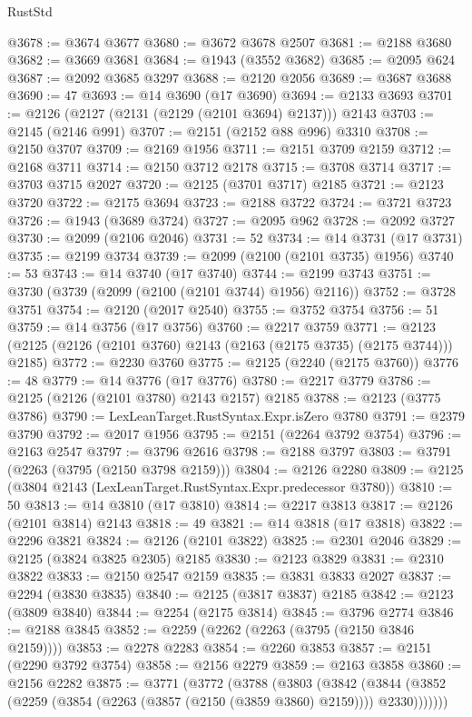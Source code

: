 \begin{lexlean}{RustStd}
\begin{coremodule}
@3678 := @3674 @3677
@3680 := @3672 @3678 @2507
@3681 := @2188 @3680
@3682 := @3669 @3681
@3684 := @1943 (@3552 @3682)
@3685 := @2095 @624
@3687 := @2092 @3685 @3297
@3688 := @2120 @2056
@3689 := @3687 @3688
@3690 := 47
@3693 := @14 @3690 (@17 @3690)
@3694 := @2133 @3693
@3701 := @2126 (@2127 (@2131 (@2129 (@2101 @3694) @2137))) @2143
@3703 := @2145 (@2146 @991)
@3707 := @2151 (@2152 @88 @996) @3310
@3708 := @2150 @3707
@3709 := @2169 @1956
@3711 := @2151 @3709 @2159
@3712 := @2168 @3711
@3714 := @2150 @3712 @2178
@3715 := @3708 @3714
@3717 := @3703 @3715 @2027
@3720 := @2125 (@3701 @3717) @2185
@3721 := @2123 @3720
@3722 := @2175 @3694
@3723 := @2188 @3722
@3724 := @3721 @3723
@3726 := @1943 (@3689 @3724)
@3727 := @2095 @962
@3728 := @2092 @3727
@3730 := @2099 (@2106 @2046)
@3731 := 52
@3734 := @14 @3731 (@17 @3731)
@3735 := @2199 @3734
@3739 := @2099 (@2100 (@2101 @3735) @1956)
@3740 := 53
@3743 := @14 @3740 (@17 @3740)
@3744 := @2199 @3743
@3751 := @3730 (@3739 (@2099 (@2100 (@2101 @3744) @1956) @2116))
@3752 := @3728 @3751
@3754 := @2120 (@2017 @2540)
@3755 := @3752 @3754
@3756 := 51
@3759 := @14 @3756 (@17 @3756)
@3760 := @2217 @3759
@3771 := @2123 (@2125 (@2126 (@2101 @3760) @2143 (@2163 (@2175 @3735) (@2175 @3744))) @2185)
@3772 := @2230 @3760
@3775 := @2125 (@2240 (@2175 @3760))
@3776 := 48
@3779 := @14 @3776 (@17 @3776)
@3780 := @2217 @3779
@3786 := @2125 (@2126 (@2101 @3780) @2143 @2157) @2185
@3788 := @2123 (@3775 @3786)
@3790 := LexLeanTarget.RustSyntax.Expr.isZero @3780
@3791 := @2379 @3790
@3792 := @2017 @1956
@3795 := @2151 (@2264 @3792 @3754)
@3796 := @2163 @2547
@3797 := @3796 @2616
@3798 := @2188 @3797
@3803 := @3791 (@2263 (@3795 (@2150 @3798 @2159)))
@3804 := @2126 @2280
@3809 := @2125 (@3804 @2143 (LexLeanTarget.RustSyntax.Expr.predecessor @3780))
@3810 := 50
@3813 := @14 @3810 (@17 @3810)
@3814 := @2217 @3813
@3817 := @2126 (@2101 @3814) @2143
@3818 := 49
@3821 := @14 @3818 (@17 @3818)
@3822 := @2296 @3821
@3824 := @2126 (@2101 @3822)
@3825 := @2301 @2046
@3829 := @2125 (@3824 @3825 @2305) @2185
@3830 := @2123 @3829
@3831 := @2310 @3822
@3833 := @2150 @2547 @2159
@3835 := @3831 @3833 @2027
@3837 := @2294 (@3830 @3835)
@3840 := @2125 (@3817 @3837) @2185
@3842 := @2123 (@3809 @3840)
@3844 := @2254 (@2175 @3814)
@3845 := @3796 @2774
@3846 := @2188 @3845
@3852 := @2259 (@2262 (@2263 (@3795 (@2150 @3846 @2159))))
@3853 := @2278 @2283
@3854 := @2260 @3853
@3857 := @2151 (@2290 @3792 @3754)
@3858 := @2156 @2279
@3859 := @2163 @3858
@3860 := @2156 @2282
@3875 := @3771
    (@3772
      (@3788
        (@3803
          (@3842
            (@3844 (@3852 (@2259 (@3854 (@2263 (@3857 (@2150 (@3859 @3860) @2159)))) @2330)))))))

\end{coremodule}
\end{lexlean}
